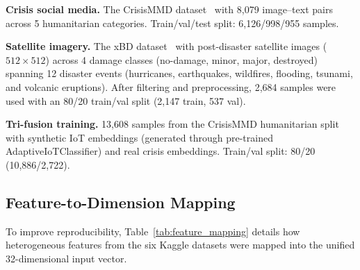 \documentclass[journal]{IEEEtran}
\begin{document}
\textbf{Crisis social media.} The CrisisMMD dataset~\cite{alam2018crisismmd} with 8,079 image--text pairs across 5 humanitarian categories. Train/val/test split: 6,126/998/955 samples.

\textbf{Satellite imagery.} The xBD dataset~\cite{gupta2019xbd} with post-disaster satellite images ($512 \times 512$) across 4 damage classes (no-damage, minor, major, destroyed) spanning 12 disaster events (hurricanes, earthquakes, wildfires, flooding, tsunami, and volcanic eruptions). After filtering and preprocessing, 2,684 samples were used with an 80/20 train/val split (2,147 train, 537 val).

\textbf{Tri-fusion training.} 13,608 samples from the CrisisMMD humanitarian split with synthetic IoT embeddings (generated through pre-trained AdaptiveIoTClassifier) and real crisis embeddings. Train/val split: 80/20 (10,886/2,722).

\subsection{Feature-to-Dimension Mapping}
\label{sec:feature_mapping}

To improve reproducibility, Table~\ref{tab:feature_mapping} details how heterogeneous features from the six Kaggle datasets were mapped into the unified 32-dimensional input vector.
\end{document}
